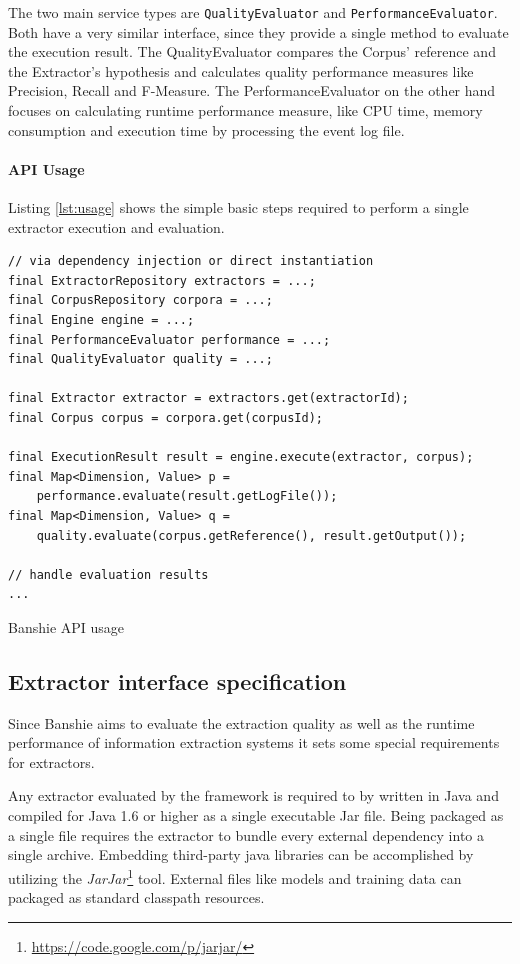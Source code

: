 The two main service types are \texttt{QualityEvaluator} and \texttt{PerformanceEvaluator}. Both have a very similar interface, since they provide a single method to evaluate the execution result. The QualityEvaluator compares the Corpus' reference and the Extractor's hypothesis and calculates quality performance measures like Precision, Recall and F-Measure. The PerformanceEvaluator on the other hand focuses on calculating runtime performance measure, like CPU time, memory consumption and execution time by processing the event log file.

\paragraph{API Usage}
Listing \ref{lst:usage} shows the simple basic steps required to perform a single extractor execution and evaluation.

\begin{listing}[H]
\begin{verbatim}
// via dependency injection or direct instantiation
final ExtractorRepository extractors = ...;
final CorpusRepository corpora = ...;
final Engine engine = ...;
final PerformanceEvaluator performance = ...;
final QualityEvaluator quality = ...;

final Extractor extractor = extractors.get(extractorId);
final Corpus corpus = corpora.get(corpusId);

final ExecutionResult result = engine.execute(extractor, corpus);
final Map<Dimension, Value> p = 
    performance.evaluate(result.getLogFile());
final Map<Dimension, Value> q = 
    quality.evaluate(corpus.getReference(), result.getOutput());

// handle evaluation results
...
\end{verbatim}
\caption{Banshie API usage}
\label{lst:usage}
\end{listing}

\subsection{Extractor interface specification}
Since Banshie aims to evaluate the extraction quality as well as the runtime performance of information extraction systems it sets some special requirements for extractors.

Any extractor evaluated by the framework is required to by written in Java and compiled for Java 1.6 or higher as a single executable Jar file. Being packaged as a single file requires the extractor to bundle every external dependency into a single archive. Embedding third-party java libraries can be accomplished by utilizing the \textit{JarJar}\footnote{\url{https://code.google.com/p/jarjar/}} tool. External files like models and training data can packaged as standard classpath resources.

